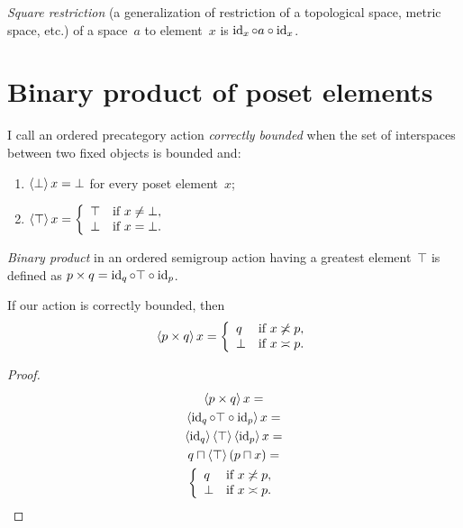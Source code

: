 \emph{Square restriction} (a generalization of restriction of a topological space, metric space, etc.) of a space~$a$ to element~$x$ is $\operatorname{id}_x\circ a\circ\operatorname{id}_x$.

\chapter{Binary product of poset elements}

\begin{defn}
I call an ordered precategory action \emph{correctly bounded} when the set of interspaces between two fixed objects is bounded and:
\begin{enumerate}
\item $\left\langle \bot\right\rangle x = \bot$ for every poset element~$x$;
\item $\left\langle \top\right\rangle x =
\left\{\begin{array}{ll}\top&\text{if }x\ne\bot,\\\bot&\text{if }x=\bot.\end{array}\right.$
\end{enumerate}
\end{defn}

\emph{Binary product} in an ordered semigroup action having a greatest element~$\top$ is defined as $p\times q=\operatorname{id}_q\circ\top\circ\operatorname{id}_p$.

\begin{thm}
If our action is correctly bounded, then
\[
\left\langle p\times q\right\rangle x =
\left\{\begin{array}{ll}q&\text{if }x\not\asymp p,\\\bot&\text{if }x\asymp p.\end{array}\right.
\]
\end{thm}

\begin{proof}
\begin{multline*}
\left\langle p\times q\right\rangle x = \\
\left\langle \operatorname{id}_q\circ\top\circ\operatorname{id}_p\right\rangle x = \\
\left\langle \operatorname{id}_q\right\rangle\left\langle \top\right\rangle\left\langle \operatorname{id}_p\right\rangle x = \\
q\sqcap\left\langle \top\right\rangle(p\sqcap x) = \\
\left\{\begin{array}{ll}q&\text{if }x\not\asymp p,\\\bot&\text{if }x\asymp p.\end{array}\right.
\end{multline*}
\end{proof}

